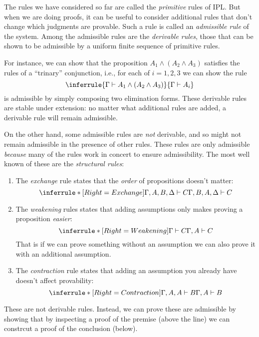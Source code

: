 \documentclass[12pt]{article}
\begin{document}
The rules we have considered so far are called the \emph{primitive}
rules of IPL. But when we are doing proofs, it can be useful to
consider additional rules that don't change which judgments are
provable. Such a rule is called an \emph{admissible rule} of the
system. Among the admissible rules are the \emph{derivable rules},
those that can be shown to be admissible by a uniform finite sequence
of primitive rules.

For instance, we can show that the proposition $A_1 \wedge (A_2 \wedge
A_3)$ satisfies the rules of a ``trinary'' conjunction, i.e., for each
of $i=1,2,3$ we can show the rule
\[ \inferrule{\Gamma \vdash A_1 \wedge (A_2 \wedge A_3)}{\Gamma \vdash A_i}\]
is admissible by simply composing two elimination forms. These
derivable rules are stable under extension: no matter what additional
rules are added, a derivable rule will remain admissible.

On the other hand, some admissible rules are \emph{not} derivable, and
so might not remain admissible in the presence of other rules. These
rules are only admissible \emph{because} many of the rules work in
concert to ensure admissibility. The most well known of these are the
\emph{structural rules}:
\begin{enumerate}
\item The \emph{exchange} rule states that the \emph{order} of propositions doesn't matter:
  \[ \inferrule*[Right=Exchange]
     {\Gamma , A, B, \Delta \vdash C}
     {\Gamma , B, A, \Delta \vdash C}
  \]
\item The \emph{weakening} rules states that adding assumptions only makes proving a proposition \emph{easier}:
  \[
  \inferrule*[Right=Weakening]
  {\Gamma \vdash C}
  {\Gamma , A \vdash C}
  \]
  That is if we can prove something without an assumption we can also
  prove it with an additional assumption.
\item The \emph{contraction} rule states that adding an assumption you already have doesn't affect provability:
  \[
  \inferrule*[Right=Contraction]
  {\Gamma, A, A \vdash B}
  {\Gamma , A \vdash B}
  \]
\end{enumerate}

These are not derivable rules. Instead, we can prove these are
admissible by showing that by inspecting a proof of the premise (above
the line) we can constrcut a proof of the conclusion (below).
\end{document}
